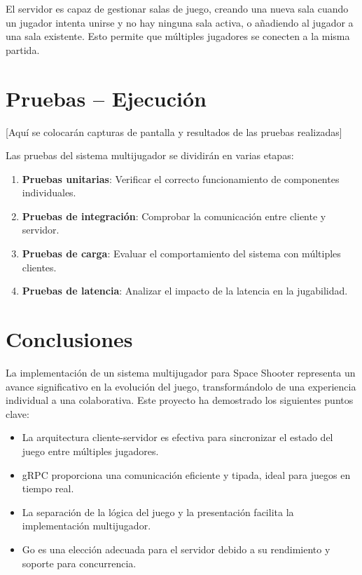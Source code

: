 \documentclass[12pt,letterpaper]{article}
\begin{document}
El servidor es capaz de gestionar salas de juego, creando una nueva sala cuando un jugador intenta unirse y no hay ninguna sala activa, o añadiendo al jugador a una sala existente. Esto permite que múltiples jugadores se conecten a la misma partida.

\section{Pruebas – Ejecución}

[Aquí se colocarán capturas de pantalla y resultados de las pruebas realizadas]

Las pruebas del sistema multijugador se dividirán en varias etapas:

\begin{enumerate}
    \item \textbf{Pruebas unitarias}: Verificar el correcto funcionamiento de componentes individuales.
    \item \textbf{Pruebas de integración}: Comprobar la comunicación entre cliente y servidor.
    \item \textbf{Pruebas de carga}: Evaluar el comportamiento del sistema con múltiples clientes.
    \item \textbf{Pruebas de latencia}: Analizar el impacto de la latencia en la jugabilidad.
\end{enumerate}

\section{Conclusiones}

La implementación de un sistema multijugador para Space Shooter representa un avance significativo en la evolución del juego, transformándolo de una experiencia individual a una colaborativa. Este proyecto ha demostrado los siguientes puntos clave:

\begin{itemize}
    \item La arquitectura cliente-servidor es efectiva para sincronizar el estado del juego entre múltiples jugadores.
    \item gRPC proporciona una comunicación eficiente y tipada, ideal para juegos en tiempo real.
    \item La separación de la lógica del juego y la presentación facilita la implementación multijugador.
    \item Go es una elección adecuada para el servidor debido a su rendimiento y soporte para concurrencia.
\end{itemize}
\end{document}

